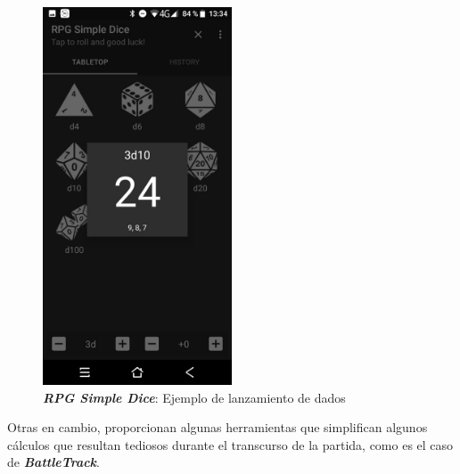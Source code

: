 \begin{figure}[H]
\begin{minipage}{0.35\textwidth}
    \end{minipage} \hspace{2cm}
    \begin{minipage}{0.35\textwidth}
        \centering
        \includegraphics[width=0.5\textwidth]{Images/RPG_Simple_Dice_2.jpeg}
        \caption{\textit{\textbf{RPG Simple Dice}}: Ejemplo de lanzamiento de 
        dados}
        
    \end{minipage}
\end{figure}\bigskip

Otras en cambio, proporcionan algunas herramientas que simplifican algunos 
cálculos que resultan tediosos durante el transcurso de la partida, como 
es el caso de \textit{\textbf{BattleTrack}}. \bigskip


